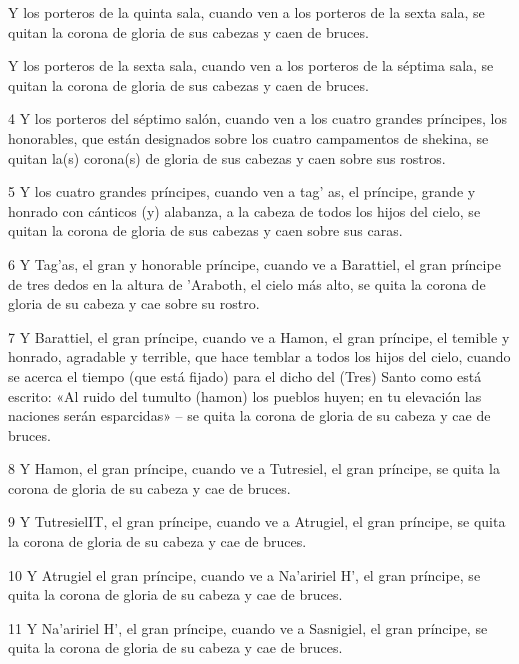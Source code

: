 \par Y los porteros de la quinta sala, cuando ven a los porteros de la sexta sala, se quitan la corona de gloria de sus cabezas y caen de bruces.

\par Y los porteros de la sexta sala, cuando ven a los porteros de la séptima sala, se quitan la corona de gloria de sus cabezas y caen de bruces.

\par 4 Y los porteros del séptimo salón, cuando ven a los cuatro grandes príncipes, los honorables, que están designados sobre los cuatro campamentos de shekina, se quitan la(s) corona(s) de gloria de sus cabezas y caen sobre sus rostros.

\par 5 Y los cuatro grandes príncipes, cuando ven a tag' as, el príncipe, grande y honrado con cánticos (y) alabanza, a la cabeza de todos los hijos del cielo, se quitan la corona de gloria de sus cabezas y caen sobre sus caras.

\par 6 Y Tag'as, el gran y honorable príncipe, cuando ve a Barattiel, el gran príncipe de tres dedos en la altura de 'Araboth, el cielo más alto, se quita la corona de gloria de su cabeza y cae sobre su rostro.

\par 7 Y Barattiel, el gran príncipe, cuando ve a Hamon, el gran príncipe, el temible y honrado, agradable y terrible, que hace temblar a todos los hijos del cielo, cuando se acerca el tiempo (que está fijado) para el dicho del (Tres) Santo como está escrito: «Al ruido del tumulto (hamon) los pueblos huyen; en tu elevación las naciones serán esparcidas» – se quita la corona de gloria de su cabeza y cae de bruces.

\par 8 Y Hamon, el gran príncipe, cuando ve a Tutresiel, el gran príncipe, se quita la corona de gloria de su cabeza y cae de bruces.

\par 9 Y TutresielIT, el gran príncipe, cuando ve a Atrugiel, el gran príncipe, se quita la corona de gloria de su cabeza y cae de bruces.

\par 10 Y Atrugiel el gran príncipe, cuando ve a Na'aririel H', el gran príncipe, se quita la corona de gloria de su cabeza y cae de bruces.

\par 11 Y Na'aririel H', el gran príncipe, cuando ve a Sasnigiel, el gran príncipe, se quita la corona de gloria de su cabeza y cae de bruces.

